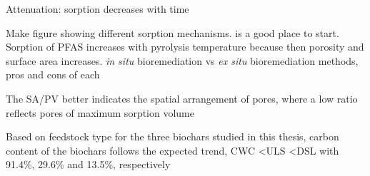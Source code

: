 Attenuation: sorption decreases with time

Make figure showing different sorption mechanisms.\citep{Li2019} is a good place to start. Sorption of PFAS increases with pyrolysis temperature because then porosity and surface area increases.  \textit{in situ} bioremediation vs \textit{ex situ} bioremediation methods, pros and cons of each

The SA/PV better indicates the spatial arrangement of pores, where a low ratio reflects pores of maximum sorption volume

\begin{table}
\centering
\caption{Surface area (SA), pore volume (PV), elemental content (C, O, H, N) and ratios for the biochars produced for the batch tests.}
\end{table}

Based on feedstock type for the three biochars studied in this thesis, carbon content of the biochars follows the expected trend, CWC \textless ULS \textless DSL with 91.4\%, 29.6\% and 13.5\%, respectively 


